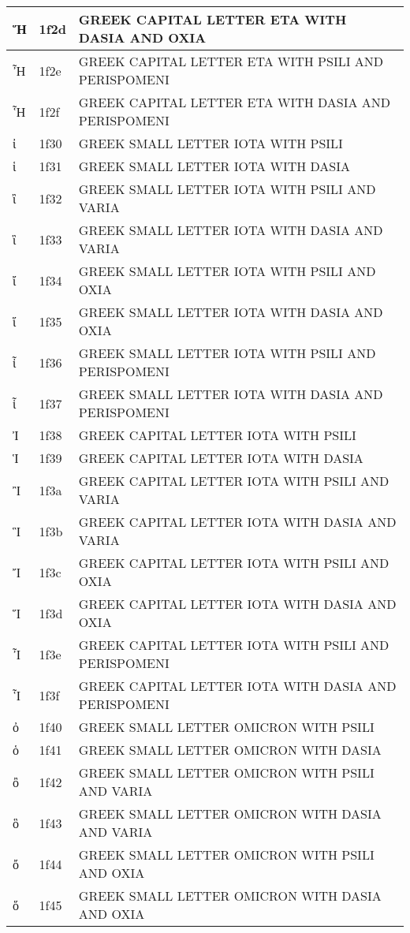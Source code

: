 \documentclass[12pt,letterpaper,openany]{book}
\begin{document}
\begin{center}
\begin{supertabular}{|m{0.25in}|m{0.5in}|m{4in}|}
Ἥ & 1f2d & GREEK CAPITAL LETTER ETA WITH DASIA AND OXIA\\\hline
Ἦ & 1f2e & GREEK CAPITAL LETTER ETA WITH PSILI AND PERISPOMENI\\\hline
Ἧ & 1f2f & GREEK CAPITAL LETTER ETA WITH DASIA AND PERISPOMENI\\\hline
ἰ & 1f30 & GREEK SMALL LETTER IOTA WITH PSILI\\\hline
ἱ & 1f31 & GREEK SMALL LETTER IOTA WITH DASIA\\\hline
ἲ & 1f32 & GREEK SMALL LETTER IOTA WITH PSILI AND VARIA\\\hline
ἳ & 1f33 & GREEK SMALL LETTER IOTA WITH DASIA AND VARIA\\\hline
ἴ & 1f34 & GREEK SMALL LETTER IOTA WITH PSILI AND OXIA\\\hline
ἵ & 1f35 & GREEK SMALL LETTER IOTA WITH DASIA AND OXIA\\\hline
ἶ & 1f36 & GREEK SMALL LETTER IOTA WITH PSILI AND PERISPOMENI\\\hline
ἷ & 1f37 & GREEK SMALL LETTER IOTA WITH DASIA AND PERISPOMENI\\\hline
Ἰ & 1f38 & GREEK CAPITAL LETTER IOTA WITH PSILI\\\hline
Ἱ & 1f39 & GREEK CAPITAL LETTER IOTA WITH DASIA\\\hline
Ἲ & 1f3a & GREEK CAPITAL LETTER IOTA WITH PSILI AND VARIA\\\hline
Ἳ & 1f3b & GREEK CAPITAL LETTER IOTA WITH DASIA AND VARIA\\\hline
Ἴ & 1f3c & GREEK CAPITAL LETTER IOTA WITH PSILI AND OXIA\\\hline
Ἵ & 1f3d & GREEK CAPITAL LETTER IOTA WITH DASIA AND OXIA\\\hline
Ἶ & 1f3e & GREEK CAPITAL LETTER IOTA WITH PSILI AND PERISPOMENI\\\hline
Ἷ & 1f3f & GREEK CAPITAL LETTER IOTA WITH DASIA AND PERISPOMENI\\\hline
ὀ & 1f40 & GREEK SMALL LETTER OMICRON WITH PSILI\\\hline
ὁ & 1f41 & GREEK SMALL LETTER OMICRON WITH DASIA\\\hline
ὂ & 1f42 & GREEK SMALL LETTER OMICRON WITH PSILI AND VARIA\\\hline
ὃ & 1f43 & GREEK SMALL LETTER OMICRON WITH DASIA AND VARIA\\\hline
ὄ & 1f44 & GREEK SMALL LETTER OMICRON WITH PSILI AND OXIA\\\hline
ὅ & 1f45 & GREEK SMALL LETTER OMICRON WITH DASIA AND OXIA\\\hline

\end{supertabular}
\end{center}
\end{document}
